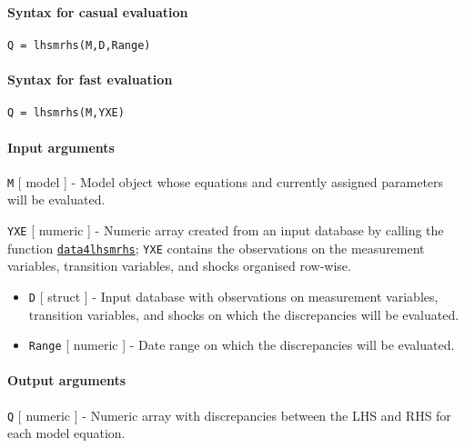 


	\paragraph{Syntax for casual
evaluation}

\begin{verbatim}
Q = lhsmrhs(M,D,Range)
\end{verbatim}

\paragraph{Syntax for fast evaluation}

\begin{verbatim}
Q = lhsmrhs(M,YXE)
\end{verbatim}

\paragraph{Input arguments}

\texttt{M} {[} model {]} - Model object whose equations and currently
assigned parameters will be evaluated.

\texttt{YXE} {[} numeric {]} - Numeric array created from an input
database by calling the function
\href{model/data4lhsmrhs}{\texttt{data4lhsmrhs}}; \texttt{YXE} contains
the observations on the measurement variables, transition variables, and
shocks organised row-wise.

\begin{itemize}
\item
  \texttt{D} {[} struct {]} - Input database with observations on
  measurement variables, transition variables, and shocks on which the
  discrepancies will be evaluated.
\item
  \texttt{Range} {[} numeric {]} - Date range on which the discrepancies
  will be evaluated.
\end{itemize}

\paragraph{Output arguments}

\texttt{Q} {[} numeric {]} - Numeric array with discrepancies between
the LHS and RHS for each model equation.

